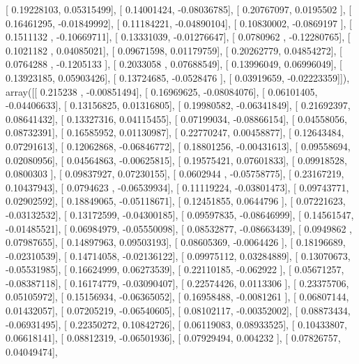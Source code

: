 \documentclass{article}
\begin{document}
       [ 0.19228103,  0.05315499],
       [ 0.14001424, -0.08036785],
       [ 0.20767097,  0.0195502 ],
       [ 0.16461295, -0.01849992],
       [ 0.11184221, -0.04890104],
       [ 0.10830002, -0.0869197 ],
       [ 0.1511132 , -0.10669711],
       [ 0.13331039, -0.01276647],
       [ 0.0780962 , -0.12280765],
       [ 0.1021182 ,  0.04085021],
       [ 0.09671598,  0.01179759],
       [ 0.20262779,  0.04854272],
       [ 0.0764288 , -0.1205133 ],
       [ 0.2033058 ,  0.07688549],
       [ 0.13996049,  0.06996049],
       [ 0.13923185,  0.05903426],
       [ 0.13724685, -0.0528476 ],
       [ 0.03919659, -0.02223359]]), array([[ 0.215238  , -0.00851494],
       [ 0.16969625, -0.08084076],
       [ 0.06101405, -0.04406633],
       [ 0.13156825,  0.01316805],
       [ 0.19980582, -0.06341849],
       [ 0.21692397,  0.08641432],
       [ 0.13327316,  0.04115455],
       [ 0.07199034, -0.08866154],
       [ 0.04558056,  0.08732391],
       [ 0.16585952,  0.01130987],
       [ 0.22770247,  0.00458877],
       [ 0.12643484,  0.07291613],
       [ 0.12062868, -0.06846772],
       [ 0.18801256, -0.00431613],
       [ 0.09558694,  0.02080956],
       [ 0.04564863, -0.00625815],
       [ 0.19575421,  0.07601833],
       [ 0.09918528,  0.0800303 ],
       [ 0.09837927,  0.07230155],
       [ 0.0602944 , -0.05758775],
       [ 0.23167219,  0.10437943],
       [ 0.0794623 , -0.06539934],
       [ 0.11119224, -0.03801473],
       [ 0.09743771,  0.02902592],
       [ 0.18849065, -0.05118671],
       [ 0.12451855,  0.0644796 ],
       [ 0.07221623, -0.03132532],
       [ 0.13172599, -0.04300185],
       [ 0.09597835, -0.08646999],
       [ 0.14561547, -0.01485521],
       [ 0.06984979, -0.05550098],
       [ 0.08532877, -0.08663439],
       [ 0.0949862 ,  0.07987655],
       [ 0.14897963,  0.09503193],
       [ 0.08605369, -0.0064426 ],
       [ 0.18196689, -0.02310539],
       [ 0.14714058, -0.02136122],
       [ 0.09975112,  0.03284889],
       [ 0.13070673, -0.05531985],
       [ 0.16624999,  0.06273539],
       [ 0.22110185, -0.062922  ],
       [ 0.05671257, -0.08387118],
       [ 0.16174779, -0.03090407],
       [ 0.22574426,  0.0113306 ],
       [ 0.23375706,  0.05105972],
       [ 0.15156934, -0.06365052],
       [ 0.16958488, -0.0081261 ],
       [ 0.06807144,  0.01432057],
       [ 0.07205219, -0.06540605],
       [ 0.08102117, -0.00352002],
       [ 0.08873434, -0.06931495],
       [ 0.22350272,  0.10842726],
       [ 0.06119083,  0.08933525],
       [ 0.10433807,  0.06618141],
       [ 0.08812319, -0.06501936],
       [ 0.07929494,  0.004232  ],
       [ 0.07826757,  0.04049474],
\end{document}
